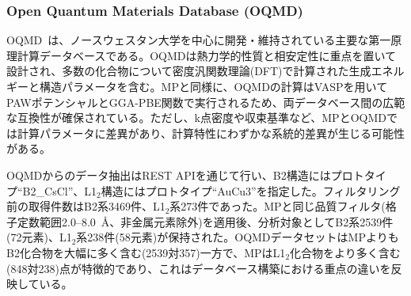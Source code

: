 \documentclass[a4paper,10pt,5p]{elsarticle}
\begin{document}

\subsubsection{Open Quantum Materials Database (OQMD)}
OQMD~\citep{saal2013}は、ノースウェスタン大学を中心に開発・維持されている主要な第一原理計算データベースである。OQMDは熱力学的性質と相安定性に重点を置いて設計され、多数の化合物について密度汎関数理論(DFT)で計算された生成エネルギーと構造パラメータを含む。MPと同様に、OQMDの計算はVASPを用いてPAWポテンシャルとGGA-PBE関数で実行されるため、両データベース間の広範な互換性が確保されている。ただし、k点密度や収束基準など、MPとOQMDでは計算パラメータに差異があり、計算特性にわずかな系統的差異が生じる可能性がある。

OQMDからのデータ抽出はREST APIを通じて行い、B2構造にはプロトタイプ``B2\_CsCl''、L1$_2$構造にはプロトタイプ``AuCu3''を指定した。フィルタリング前の取得件数はB2系3469件、L1$_2$系273件であった。MPと同じ品質フィルタ(格子定数範囲2.0--8.0~\AA、非金属元素除外)を適用後、分析対象としてB2系2539件(72元素)、L1$_2$系238件(58元素)が保持された。OQMDデータセットはMPよりもB2化合物を大幅に多く含む(2539対357)一方で、MPはL1$_2$化合物をより多く含む(848対238)点が特徴的であり、これはデータベース構築における重点の違いを反映している。

\end{document}
